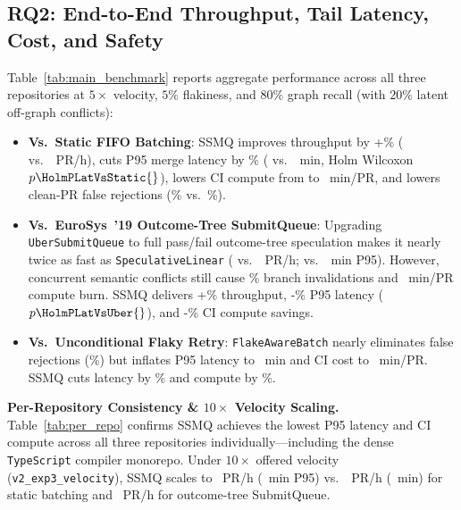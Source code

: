 \subsection{RQ2: End-to-End Throughput, Tail Latency, Cost, and Safety}
Table~\ref{tab:main_benchmark} reports aggregate performance across all three repositories at $5\times$ velocity, $5\%$ flakiness, and $80\%$ graph recall (with $20\%$ latent off-graph conflicts):
\begin{itemize}
    \item \textbf{Vs.\ Static FIFO Batching}: SSMQ improves throughput by +\GainTputVsStaticPct{}\% (\SSMQThroughput{} vs.\ \StaticThroughput{}~PR/h), cuts P95 merge latency by \LatRedVsStaticPct{}\% (\SSMQPNinetyFiveLat{} vs.\ \StaticPNinetyFiveLat{}~min, Holm Wilcoxon $p\HolmPLatVsStatic{}$), lowers CI compute from \StaticCICost{} to \SSMQCICost{}~min/PR, and lowers clean-PR false rejections (\SSMQFalseRejPct{}\% vs.\ \StaticFalseRejPct{}\%).
    \item \textbf{Vs.\ EuroSys~'19 Outcome-Tree SubmitQueue}: Upgrading \texttt{UberSubmitQueue} to full pass/fail outcome-tree speculation makes it nearly twice as fast as \texttt{SpeculativeLinear} (\UberThroughput{} vs.\ \SpecLinThroughput{}~PR/h; \UberPNinetyFiveLat{} vs.\ \SpecLinPNinetyFiveLat{}~min P95). However, concurrent semantic conflicts still cause \UberInvalidRatePct{}\% branch invalidations and \UberCICost{}~min/PR compute burn. SSMQ delivers +\GainTputVsUberPct{}\% throughput, -\LatRedVsUberPct{}\% P95 latency ($p\HolmPLatVsUber{}$), and -\CostSaveVsUberPct{}\% CI compute savings.
    \item \textbf{Vs.\ Unconditional Flaky Retry}: \texttt{FlakeAwareBatch} nearly eliminates false rejections (\FlakeBatchFalseRejPct{}\%) but inflates P95 latency to \FlakeBatchPNinetyFiveLat{}~min and CI cost to \FlakeBatchCICost{}~min/PR. SSMQ cuts latency by \LatRedVsFlakePct{}\% and compute by \CostSaveVsFlakePct{}\%.
\end{itemize}

\textbf{Per-Repository Consistency \& $10\times$ Velocity Scaling.} Table~\ref{tab:per_repo} confirms SSMQ achieves the lowest P95 latency and CI compute across all three repositories individually---including the dense \texttt{TypeScript} compiler monorepo. Under $10\times$ offered velocity (\texttt{v2\_exp3\_velocity}), SSMQ scales to \SSMQTenXThroughput{}~PR/h (\SSMQTenXPNinetyFiveLat{}~min P95) vs.\ \StaticTenXThroughput{}~PR/h (\StaticTenXPNinetyFiveLat{}~min) for static batching and \UberTenXThroughput{}~PR/h for outcome-tree SubmitQueue.

